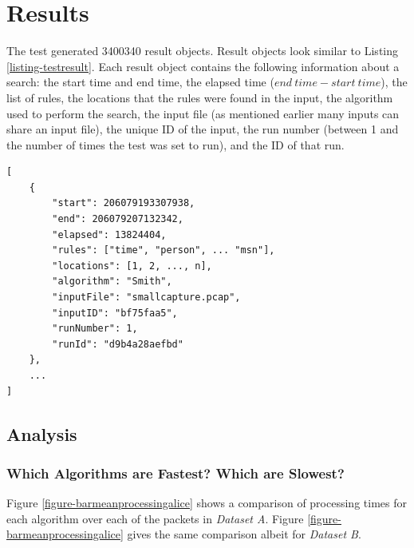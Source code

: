\documentclass[11pt]{article}
\begin{document}
\section{Results}

The test generated 3400340 result objects. Result objects look similar to Listing \ref{listing-testresult}. Each result object contains the following information about a search: the start time and end time, the elapsed time ($ end\ time - start\ time $), the list of rules, the locations that the rules were found in the input, the algorithm used to perform the search, the input file (as mentioned earlier many inputs can share an input file), the unique ID of the input, the run number (between 1 and the number of times the test was set to run), and the ID of that run.

\begin{lstlisting}[caption=Example result, label=listing-testresult]
[
    {
        "start": 206079193307938,
        "end": 206079207132342,
        "elapsed": 13824404,
        "rules": ["time", "person", ... "msn"],
        "locations": [1, 2, ..., n],
        "algorithm": "Smith",
        "inputFile": "smallcapture.pcap",
        "inputID": "bf75faa5",
        "runNumber": 1,
        "runId": "d9b4a28aefbd"
    },
    ...
]
\end{lstlisting}

\subsection{Analysis}

\subsubsection{Which Algorithms are Fastest? Which are Slowest?}

Figure \ref{figure-barmeanprocessingalice} shows a comparison of processing times for each algorithm over each of the packets in \textit{Dataset A}. Figure \ref{figure-barmeanprocessingalice} gives the same comparison albeit for \textit{Dataset B}.
\end{document}
